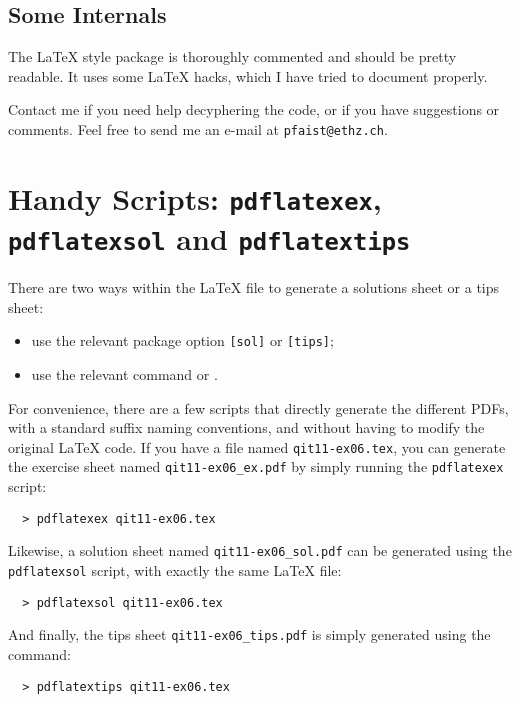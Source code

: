 \documentclass[11pt,a4paper]{article}
\begin{document}
\subsection{Some Internals}
\label{sec:Internals}

The \LaTeX{} style package is thoroughly commented and should be pretty readable. It uses
some \LaTeX{} hacks, which I have tried to document properly.

Contact me if you need help decyphering the code, or if you have suggestions or
comments. Feel free to send me an e-mail at \texttt{pfaist{@}ethz.ch}.


\section{Handy Scripts: \texttt{pdflatexex}, \texttt{pdflatexsol} and \texttt{pdflatextips}}
\label{sec:handyscriptspdflatex}

There are two ways within the \LaTeX{} file to generate a solutions sheet or a tips sheet:
\begin{itemize}
\item use the relevant package option \texttt{[sol]} or \texttt{[tips]};
\item use the relevant command  or
  .
\end{itemize}

For convenience, there are a few scripts that directly generate the different PDFs, with a
standard suffix naming conventions, and without having to modify the original \LaTeX{}
code. If you have a file named \texttt{qit11-ex06.tex}, you can generate the exercise
sheet named \verb|qit11-ex06_ex.pdf| by simply running the \texttt{pdflatexex} script:
\begin{pkgverbatim}
\begin{verbatim}
  > pdflatexex qit11-ex06.tex
\end{verbatim}
\end{pkgverbatim}
Likewise, a solution sheet named \verb|qit11-ex06_sol.pdf| can be generated using the
\texttt{pdflatexsol} script, with exactly the same \LaTeX{} file:
\begin{pkgverbatim}
\begin{verbatim}
  > pdflatexsol qit11-ex06.tex
\end{verbatim}
\end{pkgverbatim}
And finally, the tips sheet \verb|qit11-ex06_tips.pdf| is simply generated using the
command:
\begin{pkgverbatim}
\begin{verbatim}
  > pdflatextips qit11-ex06.tex
\end{verbatim}
\end{pkgverbatim}
\end{document}
